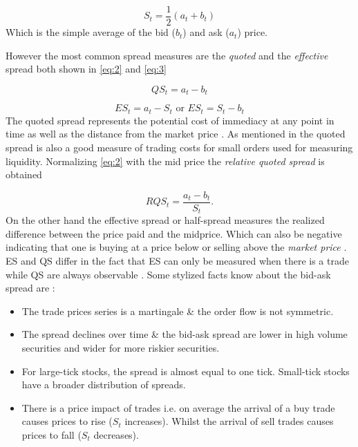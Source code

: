 \documentclass{kththesis}
\theoremstyle{definition}
\begin{document}
\begin{equation}
    \label{eq:1}
    S_{t} = \frac{1}{2}(a_t + b_t)
\end{equation}
Which is the simple average of the bid ($b_t$) and ask ($a_t$) price. 

\newpage
However the most common spread measures are the \textit{quoted} and the \textit{effective} \parencite{cartea2015algorithmic, foucault2013market} spread both shown in \autoref{eq:2} and \autoref{eq:3}

\begin{equation}
    \label{eq:2}
    QS_t = a_t - b_t
\end{equation}

\begin{equation}
    \label{eq:3}
    ES_t = a_t - S_t \text{ or } ES_t = S_t - b_t
\end{equation}
The quoted spread represents the potential cost of immediacy at any point in time as well as the distance from the market price \parencite{cartea2015algorithmic}. As mentioned in \textcite{foucault2013market} the quoted spread is also a good measure of trading costs for small orders used for measuring liquidity. Normalizing \autoref{eq:2} with the mid price the \textit{relative quoted spread} is obtained

\begin{equation*}
    RQS_t = \frac{a_t - b_t}{S_t}.
\end{equation*}
On the other hand the effective spread or half-spread measures the realized difference between the price paid and the midprice. Which can also be negative indicating that one is buying at a price below or selling above the \textit{market price} \parencite{cartea2015algorithmic}. ES and QS differ in the fact that ES can only be measured when there is a trade while QS are always observable \parencite{cartea2015algorithmic}. Some stylized facts know about the bid-ask spread are \parencite{hasbrouck2007empirical, madhavan2002market, bouchaud2018trades}:
\begin{itemize}
    \item The trade prices series is a martingale \& the order flow is not symmetric.
    \item The spread declines over time \& the bid-ask spread are lower in high volume securities and wider for more riskier securities.
    \item For large-tick stocks, the spread is almost equal to one tick. Small-tick stocks have a broader distribution of spreads.
    \item There is a price impact of trades i.e. on average the arrival of a buy trade causes prices to rise ($S_t$ increases). Whilst the arrival of sell trades causes prices to fall ($S_t$ decreases).
\end{itemize}
\newpage
\end{document}
